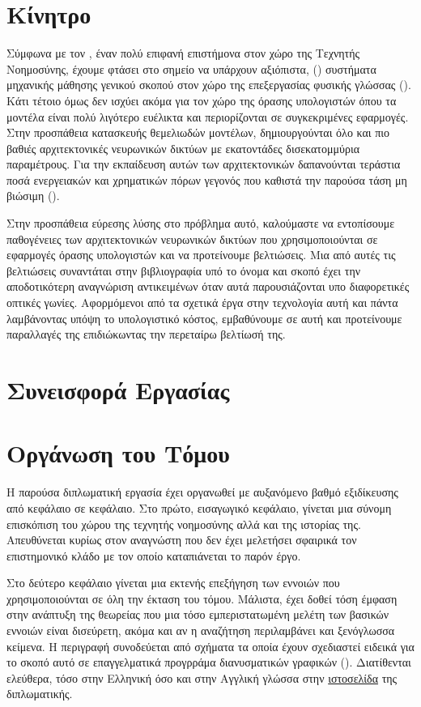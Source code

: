 \section{Κίνητρο}
Σύμφωνα με τον , έναν πολύ επιφανή επιστήμονα στον χώρο της Τεχνητής Νοημοσύνης, έχουμε φτάσει στο σημείο να υπάρχουν αξιόπιστα,  () συστήματα μηχανικής μάθησης γενικού σκοπού στον χώρο της επεξεργασίας φυσικής γλώσσας (). Κάτι τέτοιο όμως δεν ισχύει ακόμα για τον χώρο της όρασης υπολογιστών όπου τα μοντέλα είναι πολύ λιγότερο ευέλικτα και περιορίζονται σε συγκεκριμένες εφαρμογές\cite{anadiotis_2022}. Στην προσπάθεια κατασκευής θεμελιωδών μοντέλων, δημιουργούνται όλο και πιο βαθιές αρχιτεκτονικές νευρωνικών δικτύων με εκατοντάδες δισεκατομμύρια παραμέτρους. Για την εκπαίδευση αυτών των αρχιτεκτονικών δαπανούνται τεράστια ποσά ενεργειακών και χρηματικών πόρων γεγονός που καθιστά την παρούσα τάση μη βιώσιμη ().\par 
Στην προσπάθεια εύρεσης λύσης στο πρόβλημα αυτό, καλούμαστε να εντοπίσουμε παθογένειες των αρχιτεκτονικών νευρωνικών δικτύων που χρησιμοποιούνται σε εφαρμογές όρασης υπολογιστών και να προτείνουμε βελτιώσεις. Μια από αυτές τις βελτιώσεις συναντάται στην βιβλιογραφία υπό το όνομα  και σκοπό έχει την αποδοτικότερη αναγνώριση αντικειμένων όταν αυτά παρουσιάζονται υπο διαφορετικές οπτικές γωνίες. Αφορμόμενοι από τα σχετικά έργα στην τεχνολογία αυτή και πάντα λαμβάνοντας υπόψη το υπολογιστικό κόστος, εμβαθύνουμε σε αυτή και προτείνουμε παραλλαγές της επιδιώκωντας την περεταίρω βελτίωσή της.

\section{Συνεισφορά Εργασίας}
\en{\blindtext[3]}
\section{Οργάνωση του Τόμου}
Η παρούσα διπλωματική εργασία έχει οργανωθεί με αυξανόμενο βαθμό εξιδίκευσης από κεφάλαιο σε κεφάλαιο. Στο πρώτο, εισαγωγικό κεφάλαιο, γίνεται μια σύνομη επισκόπιση του χώρου της τεχνητής νοημοσύνης αλλά και της ιστορίας της. Απευθύνεται κυρίως στον αναγνώστη που δεν έχει μελετήσει σφαιρικά τον επιστημονικό κλάδο με τον οποίο καταπιάνεται το παρόν έργο.\par

Στο δεύτερο κεφάλαιο γίνεται μια εκτενής επεξήγηση των εννοιών που χρησιμοποιούνται σε όλη την έκταση του τόμου. Μάλιστα, έχει δοθεί τόση έμφαση στην ανάπτυξη της θεωρείας που μια τόσο εμπεριστατωμένη μελέτη των βασικών εννοιών είναι δισεύρετη, ακόμα και αν η αναζήτηση περιλαμβάνει και ξενόγλωσσα κείμενα. Η περιγραφή συνοδεύεται από σχήματα τα οποία έχουν σχεδιαστεί ειδεικά για το σκοπό αυτό σε επαγγελματικά προγρράμα διανυσματικών γραφικών (). Διατίθενται ελεύθερα, τόσο στην Ελληνική όσο και στην Αγγλική γλώσσα στην \href{https://github.com/abarmper/Thesis_Barmperis}{ιστοσελίδα} της διπλωματικής.\par

